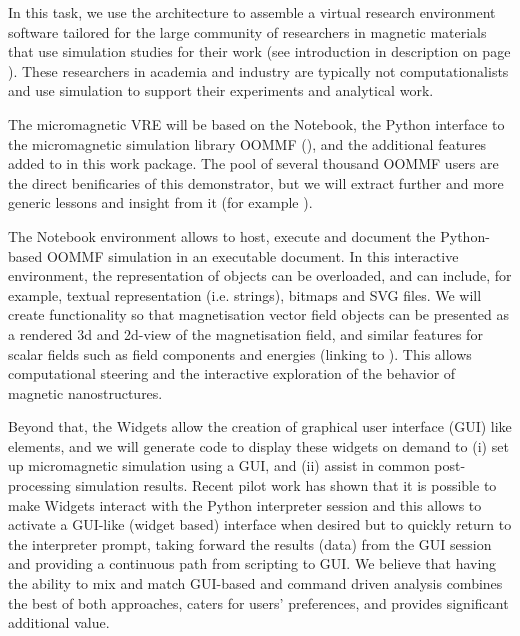 \begin{workpackage}
\begin{tasklist}
\begin{task}[lead=USO,title=Case study: micromagnetic VRE built from
  \TheProject,id=oommf-py-ipython-attributes,PM=6]

  In this task, we use the \TheProject architecture to assemble a
  virtual research environment software tailored for the large
  community of researchers in magnetic materials that use simulation
  studies for their work (see introduction in description on page
  \pageref{page:description-of-micromagnetic-vre}). These researchers in
  academia and industry are typically not computationalists and use
  simulation to support their experiments and analytical work.

  The micromagnetic VRE will be based on the \Jupyter Notebook, the
  Python interface to the micromagnetic simulation library OOMMF
  (),
  and the additional features added to \Jupyter in this work
  package. The pool of several thousand OOMMF users are the direct
  benificaries of this demonstrator, but we will extract further and
  more generic lessons and insight from it (for example
  ).

  The \Jupyter Notebook environment allows to host,
  execute and document the Python-based OOMMF simulation in an
  executable document. In this interactive environment, the
  representation of objects can be overloaded, and can include, for
  example, textual representation (i.e. strings), bitmaps and SVG
  files. We will create functionality so that magnetisation vector
  field objects can be presented as a rendered 3d and 2d-view of the
  magnetisation field, and similar features for scalar fields such as
  field components and energies (linking to
  ). This allows computational steering and the
  interactive exploration of the behavior of magnetic
  nanostructures.

  Beyond that, the \Jupyter Widgets allow the creation of graphical
  user interface (GUI) like elements, and we will generate code to
  display these widgets on demand to (i) set up micromagnetic
  simulation using a GUI, and (ii) assist in common post-processing
  simulation results. Recent pilot work has shown that it is possible
  to make \Jupyter Widgets interact with the Python interpreter
  session and this allows to activate a GUI-like (widget based)
  interface when desired but to quickly return to the interpreter
  prompt, taking forward the results (data) from the GUI session
  \cite{IPython-widget-GUI-demo-youtube-2014} and providing a
  continuous path from scripting to GUI. We believe that having the
  ability to mix and match GUI-based and command driven analysis
  combines the best of both approaches, caters for users' preferences,
  and provides significant additional value.


\end{task}
\end{tasklist}
\end{workpackage}
